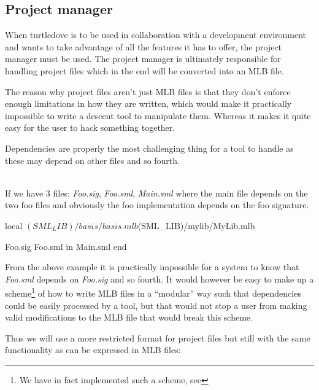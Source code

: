 \subsection{Project manager}

When turtledove is to be used in collaboration with a development environment
and wants to take advantage of all the features it has to offer, the project
manager must be used. The project manager is ultimately responsible for handling
project files which in the end will be converted into an MLB file. 

The reason why project files aren't just MLB files is that they don't enforce
enough limitations in how they are written, which would make it practically
impossible to write a descent tool to manipulate them. Whereas it makes it quite
easy for the user to hack something together.

Dependencies are properly the most challenging thing for a tool to handle as
these may depend on other files and so fourth. 

\begin{example}\ \\
  If we have 3 files: \textit{Foo.sig}, \textit{Foo.sml}, \textit{Main.sml}
  where the main file depends on the two foo files and obviously the foo
  implementation depends on the foo signature. 

  \begin{sml}
local
  $(SML_LIB)/basis/basis.mlb
  $(SML_LIB)/mylib/MyLib.mlb

  Foo.sig Foo.sml
in
  Main.sml
end    
  \end{sml}
\end{example}

\noindent
From the above example it is practically impossible for a system to know that
\textit{Foo.sml} depends on \textit{Foo.sig} and so fourth. It would however be
easy to make up a scheme\footnote{We have in fact implemented such a scheme, see
  } of how to write MLB files in a ``modular'' way such that
dependencies could be easily processed by a tool, but that would not stop a user
from making valid modifications to the MLB file that would break this scheme.


Thus we will use a more restricted format for project files but still with the
same functionality as can be expressed in MLB files:

